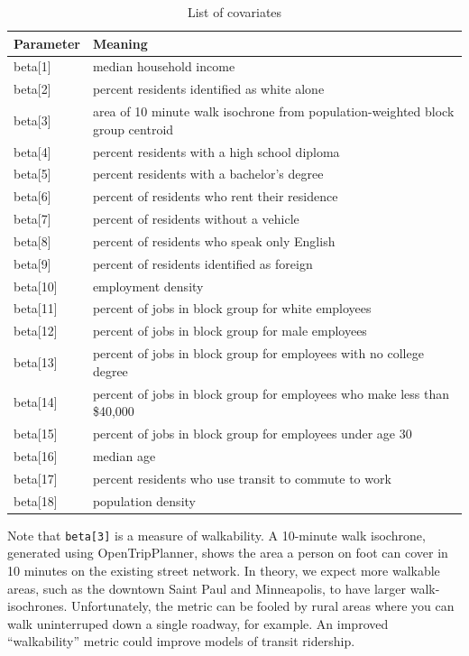 \documentclass[
]{article}
\begin{document}
\begin{table}[H]
\centering
\begin{tabular}{ll} \toprule
    Parameter & Meaning \\ \midrule
    beta[1] & median household income \\ 
    beta[2] & percent residents identified as white alone \\ 
    beta[3] &  area of 10 minute walk isochrone from population-weighted block group centroid \\
    beta[4] &  percent residents with a high school diploma \\
    beta[5] &  percent residents with a bachelor's degree \\
    beta[6] &  percent of residents who rent their residence \\
    beta[7] &  percent of residents without a vehicle \\
    beta[8] &  percent of residents who speak only English \\
    beta[9] &  percent of residents identified as foreign \\
    beta[10] & employment density \\
    beta[11] & percent of jobs in block group for white employees \\
    beta[12] & percent of jobs in block group for male employees \\
    beta[13] & percent of jobs in block group for employees with no college degree \\
    beta[14] & percent of jobs in block group for employees who make less than \$40,000 \\
    beta[15] & percent of jobs in block group for employees under age 30 \\
    beta[16] & median age \\
    beta[17] & percent residents who use transit to commute to work \\
    beta[18] & population density \\
    \bottomrule
 \hline
\end{tabular}
\caption{List of covariates}
\end{table}

Note that \texttt{beta{[}3{]}} is a measure of walkability. A 10-minute
walk isochrone, generated using OpenTripPlanner, shows the area a person
on foot can cover in 10 minutes on the existing street network. In
theory, we expect more walkable areas, such as the downtown Saint Paul
and Minneapolis, to have larger walk-isochrones. Unfortunately, the
metric can be fooled by rural areas where you can walk uninterruped down
a single roadway, for example. An improved ``walkability'' metric could
improve models of transit ridership.
\end{document}
